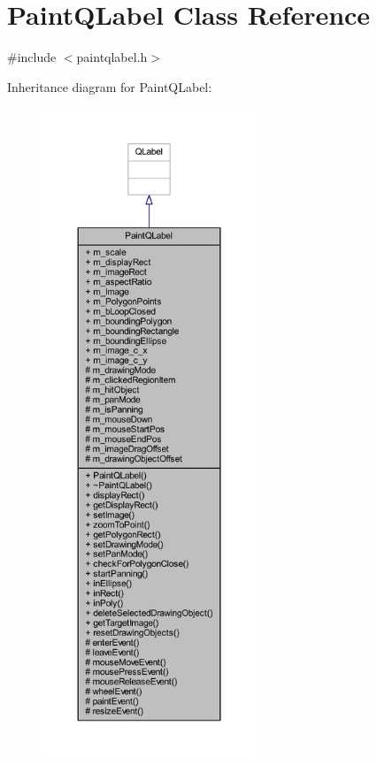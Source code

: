 \hypertarget{class_paint_q_label}{}\section{Paint\+Q\+Label Class Reference}
\label{class_paint_q_label}


{\ttfamily \#include $<$paintqlabel.\+h$>$}



Inheritance diagram for Paint\+Q\+Label\+:
\nopagebreak
\begin{figure}[H]
\begin{center}
\leavevmode
\includegraphics[height=550pt]{class_paint_q_label__inherit__graph}
\end{center}
\end{figure}



